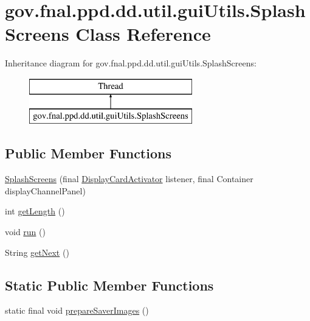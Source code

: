 \hypertarget{classgov_1_1fnal_1_1ppd_1_1dd_1_1util_1_1guiUtils_1_1SplashScreens}{\section{gov.\-fnal.\-ppd.\-dd.\-util.\-gui\-Utils.\-Splash\-Screens Class Reference}
\label{classgov_1_1fnal_1_1ppd_1_1dd_1_1util_1_1guiUtils_1_1SplashScreens}
}
Inheritance diagram for gov.\-fnal.\-ppd.\-dd.\-util.\-gui\-Utils.\-Splash\-Screens\-:\begin{figure}[H]
\begin{center}
\leavevmode
\includegraphics[height=2.000000cm]{classgov_1_1fnal_1_1ppd_1_1dd_1_1util_1_1guiUtils_1_1SplashScreens}
\end{center}
\end{figure}
\subsection*{Public Member Functions}
\begin{DoxyCompactItemize}
\item 
\hyperlink{classgov_1_1fnal_1_1ppd_1_1dd_1_1util_1_1guiUtils_1_1SplashScreens_a3b01fff5fc7c9d20e1229bd9441d66ce}{Splash\-Screens} (final \hyperlink{interfacegov_1_1fnal_1_1ppd_1_1dd_1_1interfaces_1_1DisplayCardActivator}{Display\-Card\-Activator} listener, final Container display\-Channel\-Panel)
\item 
int \hyperlink{classgov_1_1fnal_1_1ppd_1_1dd_1_1util_1_1guiUtils_1_1SplashScreens_aa72109c01206e7fc3866440d8d9680be}{get\-Length} ()
\item 
void \hyperlink{classgov_1_1fnal_1_1ppd_1_1dd_1_1util_1_1guiUtils_1_1SplashScreens_af5353d7417b0c9b0c3955e34fc40619c}{run} ()
\item 
String \hyperlink{classgov_1_1fnal_1_1ppd_1_1dd_1_1util_1_1guiUtils_1_1SplashScreens_a19bce9c642238c470303f72048935cd1}{get\-Next} ()
\end{DoxyCompactItemize}
\subsection*{Static Public Member Functions}
\begin{DoxyCompactItemize}
\item 
static final void \hyperlink{classgov_1_1fnal_1_1ppd_1_1dd_1_1util_1_1guiUtils_1_1SplashScreens_a922c8ee14d1c31b73bce2b7380ffed16}{prepare\-Saver\-Images} ()
\end{DoxyCompactItemize}


